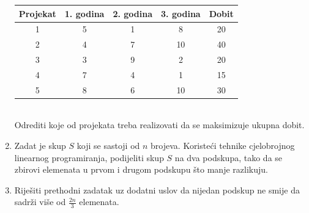 \documentclass[a4paper, utf8, 11pt, colorlinks]{book}
\begin{document}
\begin{enumerate}
	\begin{tabular}{|c|c|c|c|c|}
		\hline
		Projekat & 1. godina & 2. godina & 3. godina & Dobit \\
		\hline
		1 & 5 & 1 & 8 & 20 \\
		\hline
		2 & 4 & 7 & 10 & 40 \\
		\hline
		3 & 3 & 9 & 2 & 20 \\
		\hline
		4 & 7 & 4 & 1 & 15 \\
		\hline
		5 & 8 & 6 & 10 & 30 \\
		\hline
	\end{tabular}  \\
	Odrediti koje od projekata treba realizovati da se maksimizuje ukupna dobit.
	
	\item Zadat je skup $S$ koji se sastoji od $n$ brojeva. Koristeći tehnike cjelobrojnog linearnog programiranja, podijeliti skup $S$ na dva podskupa, tako da se zbirovi elemenata u prvom i drugom podskupu što manje razlikuju.
	
	\item Riješiti prethodni zadatak uz dodatni uslov da nijedan podskup ne smije da sadrži više od $\frac {2n}3$ elemenata.
	


\end{enumerate}
\end{document}
